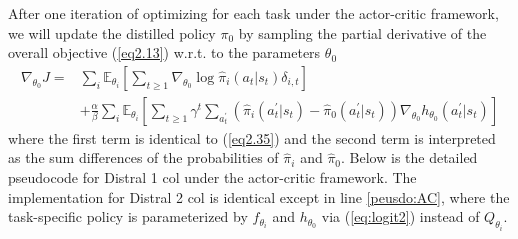 \documentclass[12pt]{report}
\begin{document}
After one iteration of optimizing for each task under the actor-critic framework, we will update the distilled policy $\pi_0$ by sampling the partial derivative of the overall objective (\ref{eq2.13}) w.r.t. to the parameters $\theta_0$
\begin{align}
    \nabla_{\theta_0}J = &\sum_i \mathbb{E}_{\theta_i}\left[\sum_{t\ge1}\nabla_{\theta_0}\log \hat{\pi}_i(a_t|s_t)\delta_{i,t}\right] \label{eq:ac_j0}\\
    &+ \frac{\alpha}{\beta}\sum_i \mathbb{E}_{\theta_i}\left[\sum_{t\ge1}\gamma^t\sum_{a_t^\prime}(\hat{\pi}_i(a^\prime_t|s_t)-\hat{\pi}_0(a^\prime_t|s_t))\nabla_{\theta_0}h_{\theta_0}(a^\prime_t|s_t)\right] \nonumber
\end{align}
where the first term is identical to (\ref{eq2.35}) and the second term is interpreted as the sum differences of the probabilities of $\hat{\pi}_i$ and $\hat{\pi}_0$. Below is the detailed pseudocode for Distral 1 col under the actor-critic framework. The implementation for Distral 2 col is identical except in line \ref{peusdo:AC}, where the task-specific policy is parameterized by $f_{\theta_i}$ and $h_{\theta_0}$ via (\ref{eq:logit2}) instead of $Q_{\theta_i}$.
\end{document}
